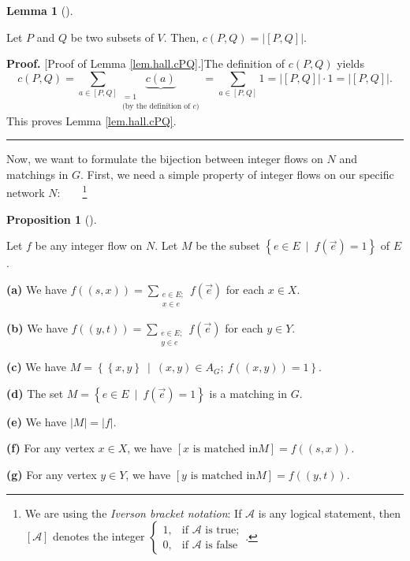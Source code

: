 \documentclass[numbers=enddot,12pt,final,onecolumn,notitlepage]{scrartcl}%
\theoremstyle{definition}
\newtheorem{lem}[theo]{Lemma}
\newenvironment{lemma}[1][]
{\begin{lem}[#1]\begin{leftbar}}
{\end{leftbar}\end{lem}}
\newtheorem{prop}[theo]{Proposition}
\newenvironment{proposition}[1][]
{\begin{prop}[#1]\begin{leftbar}}
{\end{leftbar}\end{prop}}
\newenvironment{proof}[1][Proof]{\noindent\textbf{#1.} }{\ \rule{0.5em}{0.5em}}
\let\sumnonlimits\sum
\renewcommand{\sum}{\sumnonlimits\limits}
\begin{document}
\begin{lemma}
\label{lem.hall.cPQ}Let $P$ and $Q$ be two subsets of $V$. Then, $c\left(
P,Q\right)  =\left\vert \left[  P,Q\right]  \right\vert $.
\end{lemma}

\begin{proof}
[Proof of Lemma \ref{lem.hall.cPQ}.]The definition of $c\left(  P,Q\right)  $
yields%
\[
c\left(  P,Q\right)  =\sum_{a\in\left[  P,Q\right]  }\underbrace{c\left(
a\right)  }_{\substack{=1\\\text{(by the definition of }c\text{)}}}=\sum
_{a\in\left[  P,Q\right]  }1=\left\vert \left[  P,Q\right]  \right\vert
\cdot1=\left\vert \left[  P,Q\right]  \right\vert .
\]
This proves Lemma \ref{lem.hall.cPQ}.
\end{proof}

Now, we want to formulate the bijection between integer flows on $N$ and
matchings in $G$. First, we need a simple property of integer flows on our
specific network $N$:\ \ \ \ \footnote{We are using the \textit{Iverson
bracket notation}: If $\mathcal{A}$ is any logical statement, then $\left[
\mathcal{A}\right]  $ denotes the integer $%
\begin{cases}
1, & \text{if }\mathcal{A}\text{ is true};\\
0, & \text{if }\mathcal{A}\text{ is false}%
\end{cases}
$.}

\begin{proposition}
\label{prop.hall.lem1}Let $f$ be any integer flow on $N$. Let $M$ be the
subset $\left\{  e\in E\ \mid\ f\left(  \overrightarrow{e}\right)  =1\right\}
$ of $E$.

\textbf{(a)} We have $f\left(  \left(  s,x\right)  \right)  =\sum
_{\substack{e\in E;\\x\in e}}f\left(  \overrightarrow{e}\right)  $ for each
$x\in X$.

\textbf{(b)} We have $f\left(  \left(  y,t\right)  \right)  =\sum
_{\substack{e\in E;\\y\in e}}f\left(  \overrightarrow{e}\right)  $ for each
$y\in Y$.

\textbf{(c)} We have $M=\left\{  \left\{  x,y\right\}  \ \mid\ \left(
x,y\right)  \in A_{G};\ f\left(  \left(  x,y\right)  \right)  =1\right\}  $.

\textbf{(d)} The set $M=\left\{  e\in E\ \mid\ f\left(  \overrightarrow{e}%
\right)  =1\right\}  $ is a matching in $G$.

\textbf{(e)} We have $\left\vert M\right\vert =\left\vert f\right\vert $.

\textbf{(f)} For any vertex $x\in X$, we have $\left[  x\text{ is matched in
}M\right]  =f\left(  \left(  s,x\right)  \right)  $.

\textbf{(g)} For any vertex $y\in Y$, we have $\left[  y\text{ is matched in
}M\right]  =f\left(  \left(  y,t\right)  \right)  $.
\end{proposition}
\end{document}
